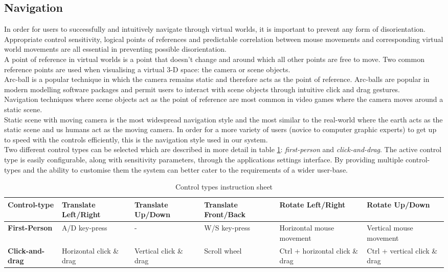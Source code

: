 \subsection{Navigation}

In order for users to successfully and intuitively navigate through virtual worlds, it is important to prevent any form of disorientation. Appropriate control sensitivity, logical points of references and predictable correlation between mouse movements and corresponding virtual world movements are all essential in preventing possible disorientation.\\
A point of reference in virtual worlds is a point that doesn't change and around which all other points are free to move. Two common reference points are used when visualising a virtual 3-D space: the camera or scene objects.\\
Arc-ball is a popular technique in which the camera remains static and therefore acts as the point of reference. Arc-balls are popular in modern modelling software packages and permit users to interact with scene objects through intuitive click and drag gestures.\\
Navigation techniques where scene objects act as the point of reference are most common in video games where the camera moves around a static scene. \\
Static scene with moving camera is the most widespread navigation style and the most similar to the real-world where the earth acts as the static scene and us humans act as the moving camera. In order for a more variety of users (novice to computer graphic experts) to get up to speed with the controls efficiently, this is the navigation style used in our system.\\

Two different control types can be selected which are described in more detail in table \ref{tab:control_types}: \textit{first-person} and \textit{click-and-drag}. The active control type is easily configurable, along with sensitivity parameters, through the applications settings interface. By providing multiple control-types and the ability to customise them the system can better cater to the requirements of a wider user-base.

\begin{table}[h]
  \centering
	  \label{tab:control_types}
	    \begin{tabular}{|p{3cm}|p{2.5cm}|p{2.5cm}|p{2.5cm}|p{2.5cm}|p{2.5cm}|}
  	    \hline	
  	    \textbf{Control-type} & \textbf{Translate Left/Right} & \textbf{Translate Up/Down} & \textbf{Translate Front/Back} & \textbf{Rotate Left/Right} & \textbf{Rotate Up/Down} \\
		\hline
		\textbf{First-Person} & A/D key-press & - & W/S key-press & Horizontal mouse movement & Vertical mouse movement \\
		\hline
		\textbf{Click-and-drag} & Horizontal click \& drag & Vertical click \& drag & Scroll wheel & Ctrl + horizontal click \& drag & Ctrl + vertical click \& drag\\
		\hline
		\end{tabular}
		\caption{Control types instruction sheet}
\end{table}

